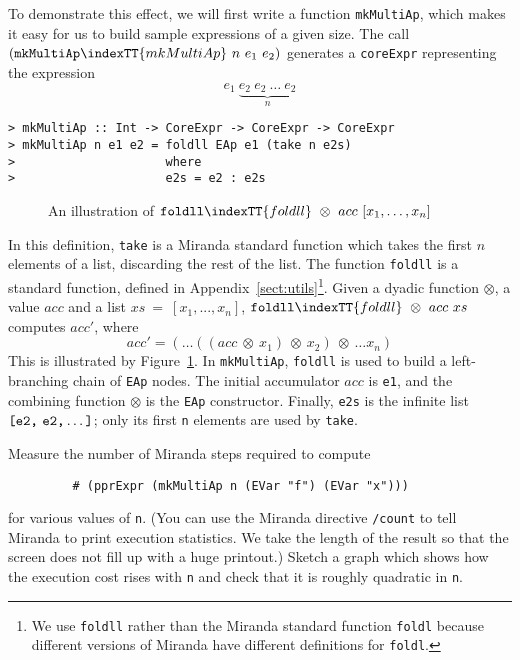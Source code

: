 To demonstrate this effect, we will first write a function \mbox{\tt mkMultiAp},
which makes it easy for us to build sample expressions of a given size.
The call $(\mbox{\tt mkMultiAp}\indexTT{mkMultiAp}~n~e_1~e_2)$
generates a \mbox{\tt coreExpr} representing the expression
\[e_1~\underbrace{e_2~e_2~\ldots~e_2}_n\]
\begin{verbatim}
> mkMultiAp :: Int -> CoreExpr -> CoreExpr -> CoreExpr
> mkMultiAp n e1 e2 = foldll EAp e1 (take n e2s)
>                     where
>                     e2s = e2 : e2s
\end{verbatim}
%
%
\begin{figure} %

\caption{An illustration of $\mbox{\tt foldll}\indexTT{foldll}~\otimes~acc~[x_1,\ldots,x_n]$}
\label{fig:foldl}
\end{figure}
In this definition, \mbox{\tt take} is a Miranda
standard function which takes the first $n$ elements of
a list, discarding the rest of the list.
The function \mbox{\tt foldll} is a standard function, defined in
Appendix~\ref{sect:utils}\footnote{%
We use \mbox{\tt foldll} rather than the Miranda standard function \mbox{\tt foldl}
because different versions of
Miranda have different definitions for \mbox{\tt foldl}.
}.
Given a dyadic function $\otimes$, a value
$acc$ and a list $xs~=~[x_1,...,x_n]$, $\mbox{\tt foldll}\indexTT{foldll}~\otimes~acc~xs$
computes $acc'$, where
\[
acc' = ( \ldots ((acc~ \otimes~ x_1)~ \otimes~ x_2)~ \otimes~ \ldots x_n)
\]
This is illustrated by Figure~\ref{fig:foldl}.
In \mbox{\tt mkMultiAp}, \mbox{\tt foldll} is used to build a left-branching chain of \mbox{\tt EAp} nodes.
The initial accumulator $acc$ is \mbox{\tt e1}, and the combining function $\otimes$ is
the \mbox{\tt EAp} constructor.
Finally, \mbox{\tt e2s} is the infinite list $\mbox{\tt [e2,}~\mbox{\tt e2,} \ldots\mbox{\tt ]}$; only its
first \mbox{\tt n} elements are used by \mbox{\tt take}.

\begin{exercise}
Measure the number of Miranda steps required to compute
\begin{verbatim}
         # (pprExpr (mkMultiAp n (EVar "f") (EVar "x")))
\end{verbatim}
for various values of \mbox{\tt n}.
(You can use the Miranda directive \mbox{\tt /count} to tell Miranda to print
execution statistics.  We take the length of the result so that the
screen does not fill up with a huge printout.)
Sketch a graph which shows how the execution cost rises with \mbox{\tt n} and check
that it is roughly quadratic in \mbox{\tt n}.
\end{exercise}

